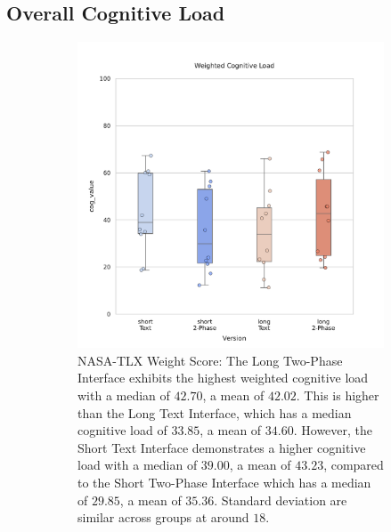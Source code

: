 \subsection{Overall Cognitive Load}
\label{sec:cog}
\begin{figure}[ht]
    \centering
    \begin{subfigure}[b]{0.46\textwidth}
        \centering
        \includegraphics[width=\textwidth]{content/image/results/nasatlx_final_value.pdf}
        \caption{NASA-TLX Weight Score: The Long Two-Phase Interface exhibits the highest weighted cognitive load with a median of $42.70$, a mean of $42.02$. This is higher than the Long Text Interface, which has a median cognitive load of $33.85$, a mean of $34.60$. However, the Short Text Interface demonstrates a higher cognitive load with a median of $39.00$, a mean of $43.23$, compared to the Short Two-Phase Interface which has a median of $29.85$, a mean of $35.36$. Standard deviation are similar across groups at around $18$.}
        \label{fig:nasatlx-final1}
    \end{subfigure}
    \hfill
    \begin{subfigure}[b]{0.49\textwidth}
        \centering

\end{subfigure}
\end{figure}
